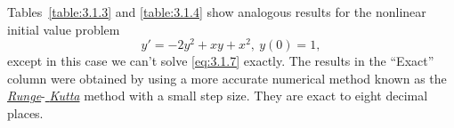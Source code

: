 \setcounter{example}{2}
\setcounter{equation}{6}
\begin{example}
  \label{example:3.1.3} \rm Tables~\ref{table:3.1.3} and \ref{table:3.1.4} show analogous results
  for the nonlinear initial value problem
  \begin{equation}
    \label{eq:3.1.7}y'=-2y^{2}+xy+x^{2},\ y(0)=1,
  \end{equation}
  except in this case we can't solve \eqref{eq:3.1.7} exactly. The results in the ``Exact'' column
  were obtained by using a more accurate numerical method known as the
  \href{https://mathshistory.st-andrews.ac.uk/Biographies/Runge/}{\relax
  \it Runge}-\href{https://mathshistory.st-andrews.ac.uk/Biographies/Kutta/}{\it
  \relax
  Kutta\/} method with a small step size. They are exact to eight decimal places.\bbox
\end{example}
\setcounter{table}{2}
